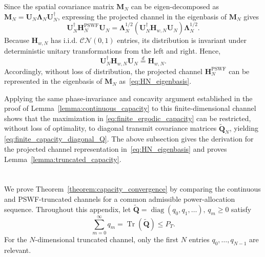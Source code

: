 \documentclass[lettersize,journal]{IEEEtran}
\theoremstyle{plain}
\begin{document}
Since the spatial covariance matrix $\mathbf{M}_N$ can be eigen-decomposed as $\mathbf{M}_N
=
\mathbf{U}_N
\boldsymbol{\Lambda}_N
\mathbf{U}_N^\dagger$, expressing the projected channel in the eigenbasis of $\mathbf{M}_N$ gives
$$
	\mathbf{U}_N^\dagger
	\mathbf{H}_N^{\mathrm{PSWF}}
	\mathbf{U}_N
	=
	\boldsymbol{\Lambda}_N^{1/2}
	\left(
	\mathbf{U}_N^\dagger
	\mathbf{H}_{w,N}
	\mathbf{U}_N
	\right)
	\boldsymbol{\Lambda}_N^{1/2}.
$$
Because $\mathbf{H}_{w,N}$ has i.i.d. $\mathcal{CN}(0, 1)$ entries, its distribution is invariant under deterministic unitary
transformations from the left and right. Hence,
$$
	\mathbf{U}_N^\dagger
	\mathbf{H}_{w,N}
	\mathbf{U}_N
	\overset{d}{=}
	\mathbf{H}_{w,N}.
$$
Accordingly, without loss of distribution, the projected channel $\mathbf{H}_N^{\mathrm{PSWF}}$ can
be represented in the eigenbasis of $\mathbf{M}_N$ as~\eqref{eq:HN_eigenbasis}. 

Applying the same phase-invariance and
concavity argument established in the proof of
Lemma~\ref{lemma:continuous_capacity} to this finite-dimensional
channel shows that the maximization in
\eqref{eq:finite_ergodic_capacity} can be restricted, without loss of
optimality, to diagonal transmit covariance matrices $\widetilde{\mathbf{Q}}_N$, yielding
\eqref{eq:finite_capacity_diagonal_Q}. The above subsection gives the derivation for the projected channel representation in~\eqref{eq:HN_eigenbasis} and proves
Lemma~\ref{lemma:truncated_capacity}.



\section{}
\label{appendix:capacity_convergence}

We prove Theorem~\ref{theorem:capacity_convergence} by comparing
the continuous and PSWF-truncated channels for a common admissible
power-allocation sequence. Throughout this appendix, let $\widetilde{\mathbf Q}
=
\operatorname{diag}(q_0,q_1,\ldots),\,
q_m\geq0$ satisfy
\begin{equation}
	\sum_{m=0}^{\infty}q_m
	=
	\operatorname{Tr}(\widetilde{\mathbf Q})
	\leq P_T .
	\label{eq:appendixF_power}
\end{equation}
For the $N$-dimensional truncated channel, only the first $N$
entries $q_0,\ldots,q_{N-1}$ are relevant.
\end{document}
